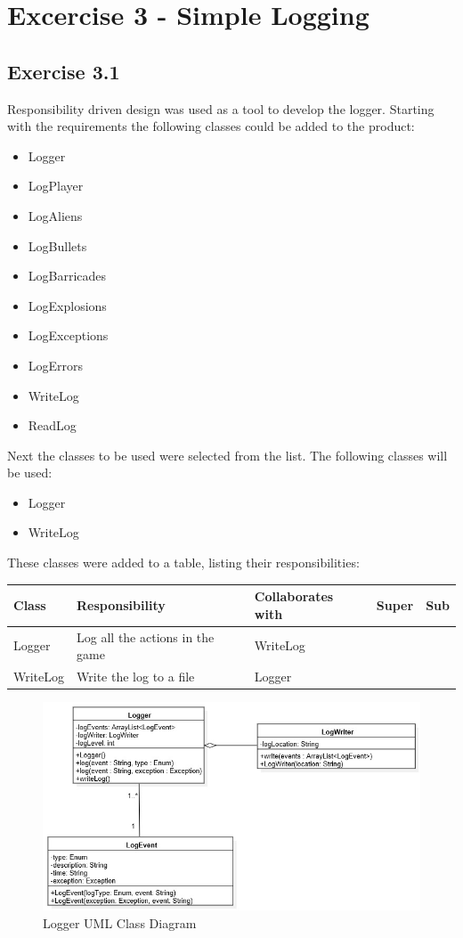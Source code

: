 \documentclass[10pt]{article}
\begin{document}
\pagebreak
\section*{Excercise 3 - Simple Logging}
\subsection{Exercise 3.1}

Responsibility driven design was used as a tool to develop the logger.
Starting with the requirements the following classes could be added to the product:

\begin{itemize}
\item Logger
\item LogPlayer
\item LogAliens
\item LogBullets
\item LogBarricades
\item LogExplosions
\item LogExceptions
\item LogErrors
\item WriteLog
\item ReadLog
\end{itemize}

Next the classes to be used were selected from the list. The following classes will be used:
\begin{itemize}
\item Logger
\item WriteLog
\end{itemize}

These classes were added to a table, listing their responsibilities:
\begin{center}
   \hspace*{-0.75in}\begin{tabular}{ | p{3cm} | p{5cm} | p{3cm} | p{2cm} | p{2cm} |}
  \hline
  Class & Responsibility & Collaborates with & Super & Sub \\ \hline
  Logger & Log all the actions in the game & WriteLog & & \\ \hline
  WriteLog & Write the log to a file & Logger & & \\ \hline
    \end{tabular}
\end{center}

\begin{figure}[ht!]
\includegraphics[width=1.1\textwidth]{LoggerUML.jpg}
\caption{Logger UML Class Diagram}
\end{figure}
\end{document}
